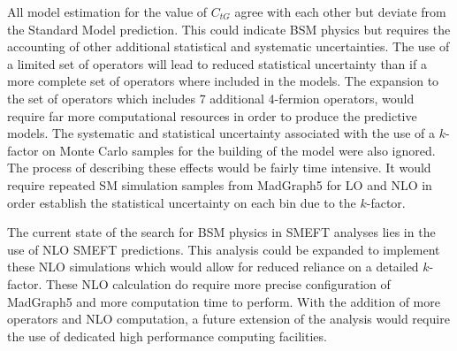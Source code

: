 \documentclass[a4paper,11pt]{article}
\begin{document}
All model estimation for the value of $C_{tG}$ agree with each other but deviate from the Standard Model prediction.
This could indicate BSM physics but requires the accounting of other additional statistical and systematic uncertainties.
The use of a limited set of operators will lead to reduced statistical uncertainty than if a more complete set of operators where included in the models.
The expansion to the set of operators which includes 7 additional 4-fermion operators, would require far more computational resources in order to produce the predictive models.
The systematic and statistical uncertainty associated with the use of a $k$-factor on Monte Carlo samples for the building of the model were also ignored.
The process of describing these effects would be fairly time intensive.
It would require repeated SM simulation samples from MadGraph5 for LO and NLO in order establish the statistical uncertainty on each bin due to the $k$-factor.

The current state of the search for BSM physics in SMEFT analyses lies in the use of NLO SMEFT predictions.
This analysis could be expanded to implement these NLO simulations which would allow for reduced reliance on a detailed $k$-factor.
These NLO calculation do require more precise configuration of MadGraph5 and more computation time to perform.
With the addition of more operators and NLO computation, a future extension of the analysis would require the use of dedicated high performance computing facilities.

\clearpage
\begingroup
\raggedright{}
\sloppy
\printbibliography{}
\endgroup
\end{document}

